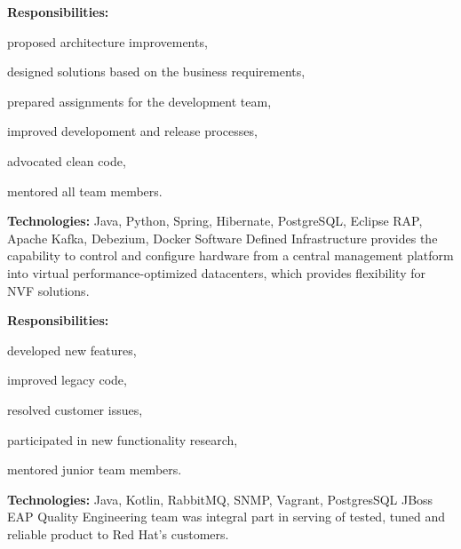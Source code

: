 \documentclass[a4paper]{deedy-resume}
\begin{document}
\vspace{4pt}
\textbf{Responsibilities:}
\begin{tightitemize}
    \item proposed architecture improvements,
    \item designed solutions based on the business requirements,
    \item prepared assignments for the development team,
    \item improved developoment and release processes,
    \item advocated clean code,
    \item mentored all team members.
\end{tightitemize}
\vspace{\topsep}
\footnotesize\textbf{Technologies:} Java, Python, Spring, Hibernate, PostgreSQL, Eclipse RAP, Apache Kafka, Debezium, Docker
\normalsize
\sectionspace
\newline
Software Defined Infrastructure provides the capability to control and configure hardware from a central management platform into virtual performance-optimized datacenters, which provides flexibility for NVF solutions.

\vspace{4pt}
\textbf{Responsibilities:}
\begin{tightitemize}
    \item developed new features,
    \item improved legacy code,
    \item resolved customer issues,
    \item participated in new functionality research,
    \item mentored junior team members.
\end{tightitemize}
\vspace{\topsep}
\footnotesize\textbf{Technologies:} Java, Kotlin, RabbitMQ, SNMP, Vagrant, PostgresSQL
\normalsize
\sectionspace
\newline
JBoss EAP Quality Engineering team was integral part in serving of tested, tuned and reliable product to Red Hat's customers.
\end{document}
